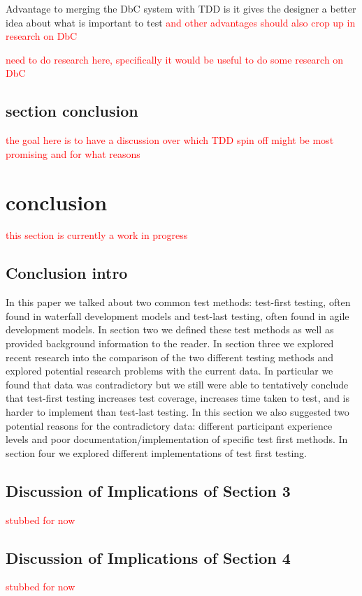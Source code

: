 \documentclass{sig-alternate}
\newcommand{\mycomment}[1]{\textcolor{red}{#1}}
\begin{document}
Advantage to merging the DbC system with TDD is it gives the designer a better idea about what is important to test \mycomment{and other advantages should also crop up in research on DbC}

\mycomment{need to do research here, specifically it would be useful to do some research on DbC}

\subsection{section conclusion}
\mycomment{the goal here is to have a discussion over which TDD spin off might be most promising and for what reasons}

\section{conclusion}
\mycomment{this section is currently a work in progress}
\subsection{Conclusion intro}

In this paper we talked about two common test methods: test-first testing, often found in waterfall development models and test-last testing, often found in agile development models.  In section two we defined these test methods as well as provided background information to the reader.  In section three we explored recent research into the comparison of the two different testing methods and explored potential research problems with the current data.  In particular we found that data was contradictory but we still were able to tentatively conclude that test-first testing increases test coverage, increases time taken to test, and is harder to implement than test-last testing.  In this section we also suggested two potential reasons for the contradictory data: different participant experience levels and poor documentation/implementation of specific test first methods. In section four we explored different implementations of test first testing.  

\subsection{Discussion of Implications of Section 3}
\mycomment{stubbed for now}

\subsection{Discussion of Implications of Section 4}
\mycomment{stubbed for now}
\end{document}
